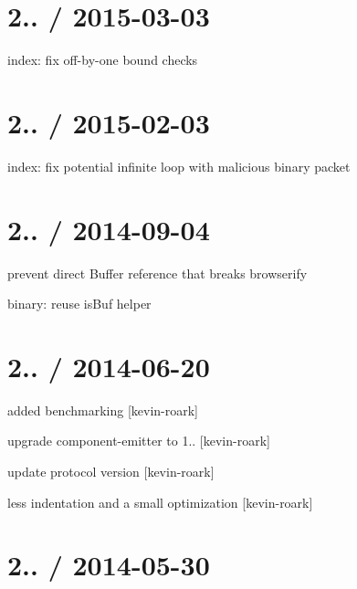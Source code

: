 \section*{2.. / 2015-\/03-\/03 }


\begin{DoxyItemize}
\item index\+: fix off-\/by-\/one bound checks
\end{DoxyItemize}

\section*{2.. / 2015-\/02-\/03 }


\begin{DoxyItemize}
\item index\+: fix potential infinite loop with malicious binary packet
\end{DoxyItemize}

\section*{2.. / 2014-\/09-\/04 }


\begin{DoxyItemize}
\item prevent direct {\ttfamily Buffer} reference that breaks browserify
\item binary\+: reuse {\ttfamily is\+Buf} helper
\end{DoxyItemize}

\section*{2.. / 2014-\/06-\/20 }


\begin{DoxyItemize}
\item added benchmarking \mbox{[}kevin-\/roark\mbox{]}
\item upgrade component-\/emitter to 1.. \mbox{[}kevin-\/roark\mbox{]}
\item update protocol version \mbox{[}kevin-\/roark\mbox{]}
\item less indentation and a small optimization \mbox{[}kevin-\/roark\mbox{]}
\end{DoxyItemize}

\section*{2.. / 2014-\/05-\/30 }


